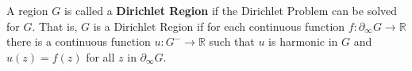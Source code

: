 A region $G$ is called a \textbf{Dirichlet Region} if the Dirichlet Problem can be solved for $G$. That is, $G$ is a Dirichlet Region if for each continuous function $f: \partial_\infty G \to \mathbb{R}$ there is a continuous function $u: G^- \to \mathbb{R}$ such that $u$ is harmonic in $G$ and $u(z) = f(z)$ for all $z$ in $\partial_\infty G$.
